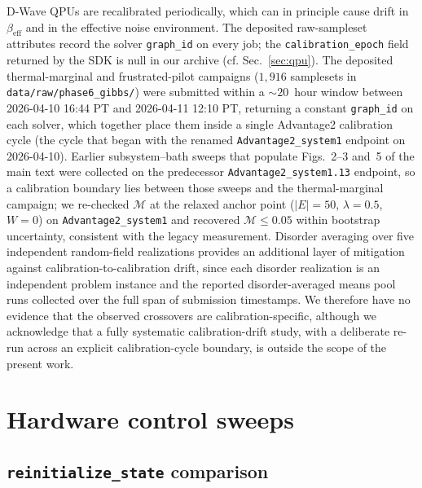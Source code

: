 \documentclass[aps,prapplied,reprint,superscriptaddress,floatfix,nofootinbib]{revtex4-2}
\begin{document}
D-Wave QPUs are recalibrated periodically, which can in principle cause drift in $\beta_\mathrm{eff}$ and in the effective noise environment.
The deposited raw-sampleset attributes record the solver \texttt{graph\_id} on every job; the \texttt{calibration\_epoch} field returned by the SDK is null in our archive (cf. Sec.~\ref{sec:qpu}).
The deposited thermal-marginal and frustrated-pilot campaigns ($1{,}916$ samplesets in \texttt{data/raw/phase6\_gibbs/}) were submitted within a $\sim\!20$~hour window between 2026-04-10 16:44 PT and 2026-04-11 12:10 PT, returning a constant \texttt{graph\_id} on each solver, which together place them inside a single Advantage2 calibration cycle (the cycle that began with the renamed \texttt{Advantage2\_system1} endpoint on 2026-04-10).
Earlier subsystem--bath sweeps that populate Figs.~2--3 and~5 of the main text were collected on the predecessor \texttt{Advantage2\_system1.13} endpoint, so a calibration boundary lies between those sweeps and the thermal-marginal campaign; we re-checked $\mathcal{M}$ at the relaxed anchor point ($|E|=50$, $\lambda=0.5$, $W=0$) on \texttt{Advantage2\_system1} and recovered $\mathcal{M}\le 0.05$ within bootstrap uncertainty, consistent with the legacy measurement.
Disorder averaging over five independent random-field realizations provides an additional layer of mitigation against calibration-to-calibration drift, since each disorder realization is an independent problem instance and the reported disorder-averaged means pool runs collected over the full span of submission timestamps.
We therefore have no evidence that the observed crossovers are calibration-specific, although we acknowledge that a fully systematic calibration-drift study, with a deliberate re-run across an explicit calibration-cycle boundary, is outside the scope of the present work.

\section{Hardware control sweeps}

\subsection{\texttt{reinitialize\_state} comparison}
\label{sec:reinit}
\end{document}
